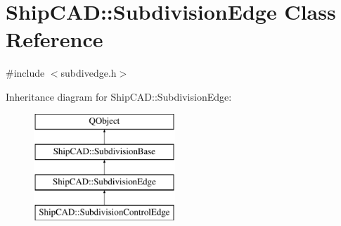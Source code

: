 \hypertarget{classShipCAD_1_1SubdivisionEdge}{\section{Ship\-C\-A\-D\-:\-:Subdivision\-Edge Class Reference}
\label{classShipCAD_1_1SubdivisionEdge}
}


{\ttfamily \#include $<$subdivedge.\-h$>$}

Inheritance diagram for Ship\-C\-A\-D\-:\-:Subdivision\-Edge\-:\begin{figure}[H]
\begin{center}
\leavevmode
\includegraphics[height=4.000000cm]{classShipCAD_1_1SubdivisionEdge}
\end{center}
\end{figure}
